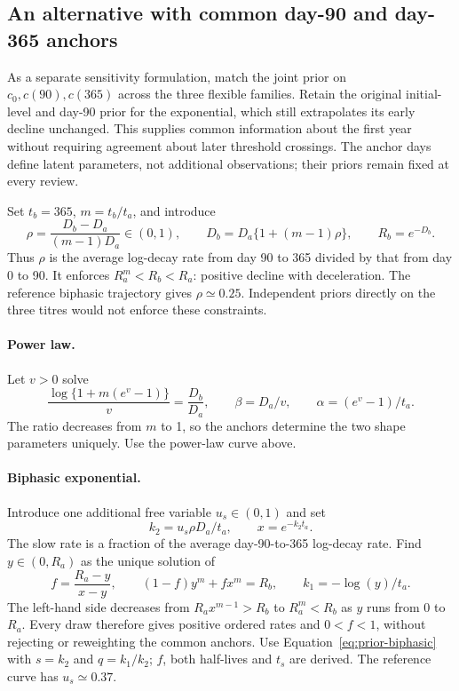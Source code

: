 \documentclass[11pt,a4paper]{article}
\begin{document}
\subsection*{An alternative with common day-90 and day-365 anchors}

As a separate sensitivity formulation, match the joint prior on
$c_0,c(90),c(365)$ across the three flexible families. Retain the original
initial-level and day-90 prior for the exponential, which still extrapolates
its early decline unchanged. This supplies common information about the
first year without requiring agreement about later threshold crossings.
The anchor days define latent parameters, not additional observations;
their priors remain fixed at every review.

Set $t_b=365$, $m=t_b/t_a$, and introduce
\begin{equation}
  \rho=\frac{D_b-D_a}{(m-1)D_a}\in(0,1),\qquad
  D_b=D_a\{1+(m-1)\rho\},\qquad R_b=e^{-D_b}.
  \label{eq:two-anchor}
\end{equation}
Thus $\rho$ is the average log-decay rate from day 90 to 365 divided by
that from day 0 to 90. It enforces $R_a^m<R_b<R_a$: positive decline
with deceleration. The reference biphasic trajectory gives
$\rho\simeq0.25$. Independent priors directly on the three titres would
not enforce these constraints.

\paragraph{Power law.}
Let $v>0$ solve
\begin{equation}
  \frac{\log\{1+m(e^v-1)\}}{v}=\frac{D_b}{D_a},\qquad
  \beta=D_a/v,\qquad \alpha=(e^v-1)/t_a.
\end{equation}
The ratio decreases from $m$ to 1, so the anchors determine the two shape
parameters uniquely. Use the power-law curve above.

\paragraph{Biphasic exponential.}
Introduce one additional free variable $u_s\in(0,1)$ and set
\begin{equation}
  k_2=u_s\rho D_a/t_a,\qquad x=e^{-k_2t_a}.
\end{equation}
The slow rate is a fraction of the average day-90-to-365 log-decay rate.
Find $y\in(0,R_a)$ as the unique solution of
\begin{equation}
  f=\frac{R_a-y}{x-y},\qquad
  (1-f)y^m+fx^m=R_b,\qquad k_1=-\log(y)/t_a.
  \label{eq:two-anchor-mixture}
\end{equation}
The left-hand side decreases from $R_ax^{m-1}>R_b$ to $R_a^m<R_b$
as $y$ runs from 0 to $R_a$. Every draw therefore gives positive ordered
rates and $0<f<1$, without rejecting or reweighting the common anchors.
Use Equation~\ref{eq:prior-biphasic} with $s=k_2$ and $q=k_1/k_2$;
$f$, both half-lives and $t_s$ are derived. The reference curve has
$u_s\simeq0.37$.
\end{document}
